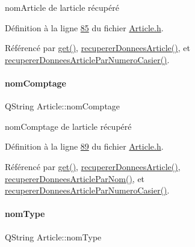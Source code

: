nom\+Article de l\textquotesingle{}article récupéré 



Définition à la ligne \hyperlink{_article_8h_source_l00085}{85} du fichier \hyperlink{_article_8h_source}{Article.\+h}.



Référencé par \hyperlink{_article_8cpp_source_l00266}{get()}, \hyperlink{_article_8cpp_source_l00050}{recuperer\+Donnees\+Article()}, et \hyperlink{_article_8cpp_source_l00156}{recuperer\+Donnees\+Article\+Par\+Numero\+Casier()}.

\mbox{\label{class_article_a1953a03d4505797952054141dbb2e327}} 
\paragraph{\texorpdfstring{nom\+Comptage}{nomComptage}}
{\footnotesize\ttfamily Q\+String Article\+::nom\+Comptage\hspace{0.3cm}{\ttfamily [private]}}



nom\+Comptage de l\textquotesingle{}article récupéré 



Définition à la ligne \hyperlink{_article_8h_source_l00089}{89} du fichier \hyperlink{_article_8h_source}{Article.\+h}.



Référencé par \hyperlink{_article_8cpp_source_l00266}{get()}, \hyperlink{_article_8cpp_source_l00050}{recuperer\+Donnees\+Article()}, \hyperlink{_article_8cpp_source_l00103}{recuperer\+Donnees\+Article\+Par\+Nom()}, et \hyperlink{_article_8cpp_source_l00156}{recuperer\+Donnees\+Article\+Par\+Numero\+Casier()}.

\mbox{\label{class_article_a06489a7445495277e44c7179b7cf8bbc}} 
\paragraph{\texorpdfstring{nom\+Type}{nomType}}
{\footnotesize\ttfamily Q\+String Article\+::nom\+Type\hspace{0.3cm}{\ttfamily [private]}}



